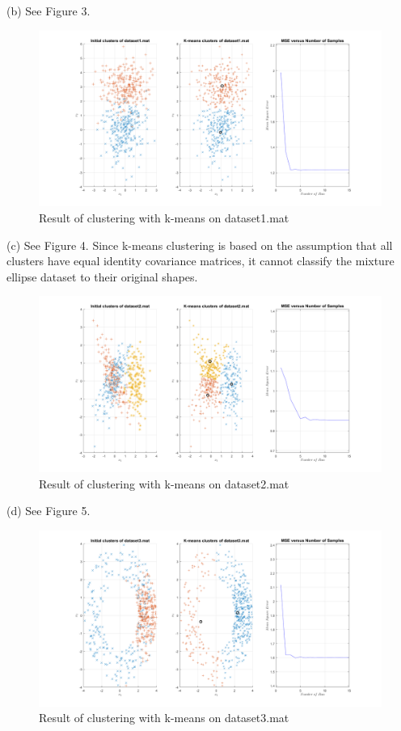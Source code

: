 \documentclass[12pt]{article}
\begin{document}
(b) See Figure 3.
\begin{figure}[H]
\centering
\includegraphics[width = 1\textwidth]{ds1.png}
\caption{Result of clustering with k-means on dataset1.mat}
\end{figure}

\noindent(c) See Figure 4. Since k-means clustering is based on the assumption that all clusters have equal identity covariance matrices, it cannot classify the mixture ellipse dataset to their original shapes.
\\

\begin{figure}[H]
\centering
\includegraphics[width = 1\textwidth]{ds2.png}
\caption{Result of clustering with k-means on dataset2.mat}
\end{figure}

\vfill
\clearpage
\noindent(d) See Figure 5.
\begin{figure}[H]
\centering
\includegraphics[width = 1\textwidth]{ds3.png}
\caption{Result of clustering with k-means on dataset3.mat}
\end{figure}
\end{document}
